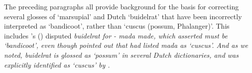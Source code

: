 The preceding paragraphs all provide background for the basis
for correcting several glosses of  ‘marsupial’
and Dutch ‘buidelrat’ that have been incorrectly interpreted
as ‘bandicoot’, rather than ‘cuscus (possum, Phalanger)’.
This includes \citeauthor{Jonker1932}’s (\citeyear{Jonker1932}) disputed \it{buidelrat} for - \it{mada
{\tl} made}, which \citet[264]{Blust2012b} asserted must be ‘bandicoot’,
even though \citet[263]{Schapper2011} pointed out that \citet{vanEngelenhoven2004}
had listed  \it{mada} as ‘cuscus’.
And as we noted,
\it{buidelrat} is glossed as ‘possum’ in several Dutch dictionaries,
and was explicitly identified as ‘cuscus’ by \citet{vanEkris1864}.

